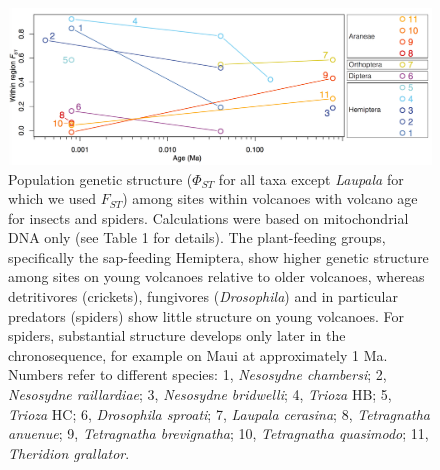 \begin{figure}[!hp] 
  \centering
  \includegraphics[scale=0.35]{figs/fig_volcanoFst.pdf}
  \caption[Population genetic structure]{Population genetic structure
($\Phi_{ST}$ for all taxa except \textit{Laupala} for which we used
$F_{ST}$) among sites within volcanoes with volcano age for insects
and spiders. Calculations were based on mitochondrial DNA only (see
Table 1 for details). The plant-feeding groups, specifically the
sap-feeding Hemiptera, show higher genetic structure among sites on
young volcanoes relative to older volcanoes, whereas detritivores
(crickets), fungivores (\textit{Drosophila}) and in particular
predators (spiders) show little structure on young volcanoes. For
spiders, substantial structure develops only later in the
chronosequence, for example on Maui at approximately 1 Ma. Numbers
refer to different species: 1, \textit{Nesosydne chambersi}; 2,
\textit{Nesosydne raillardiae}; 3, \textit{Nesosydne bridwelli}; 4,
\textit{Trioza} HB; 5, \textit{Trioza} HC; 6, \textit{Drosophila
sproati}; 7, \textit{Laupala cerasina}; 8, \textit{Tetragnatha
anuenue}; 9, \textit{Tetragnatha brevignatha}; 10, \textit{Tetragnatha
quasimodo}; 11, \textit{Theridion grallator}.}
  \label{fig:popGen}
\end{figure}


